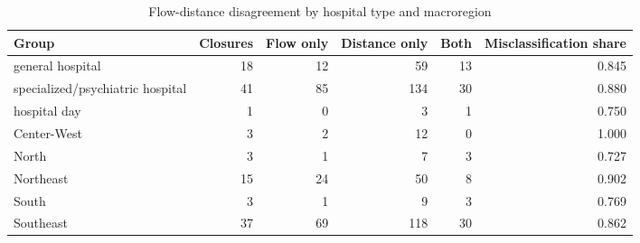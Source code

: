 \begin{table}[!htbp]\centering
\caption{Flow-distance disagreement by hospital type and macroregion}
\label{tab:flow-distance-by-type-region}
\small
\begin{tabular}{lrrrrr}
\toprule
Group & Closures & Flow only & Distance only & Both & Misclassification share \\
\midrule
general hospital & 18 & 12 & 59 & 13 & 0.845 \\
specialized/psychiatric hospital & 41 & 85 & 134 & 30 & 0.880 \\
hospital day & 1 & 0 & 3 & 1 & 0.750 \\
Center-West & 3 & 2 & 12 & 0 & 1.000 \\
North & 3 & 1 & 7 & 3 & 0.727 \\
Northeast & 15 & 24 & 50 & 8 & 0.902 \\
South & 3 & 1 & 9 & 3 & 0.769 \\
Southeast & 37 & 69 & 118 & 30 & 0.862 \\
\bottomrule
\end{tabular}
\end{table}
